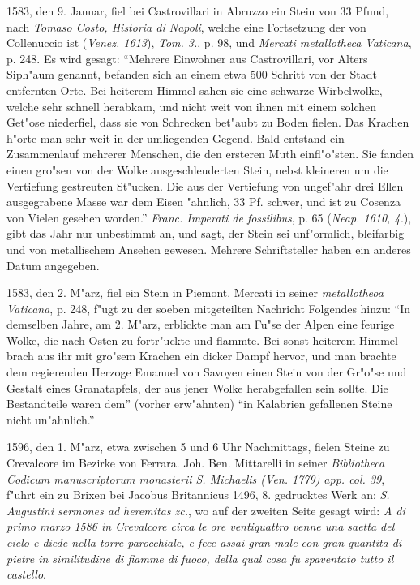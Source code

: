 \documentclass[a4paper, 11pt, oneside, polutonikogreek, german]{article}
\begin{document}
1583, den 9. Januar, fiel bei Castrovillari in Abruzzo ein Stein von 33 Pfund, nach \emph{Tomaso Costo, Historia di Napoli}, welche eine Fortsetzung der von Collenuccio ist (\emph{Venez. 1613}), \emph{Tom. 3.}, p. 98, und \emph{Mercati metallotheca Vaticana}, p. 248. Es wird gesagt: "`Mehrere Einwohner aus Castrovillari, vor Alters Siph"aum genannt, befanden sich an einem etwa 500 Schritt von der Stadt entfernten Orte. Bei heiterem Himmel sahen sie eine schwarze Wirbelwolke, welche sehr schnell herabkam, und nicht weit von ihnen mit einem solchen Get"ose niederfiel, dass sie von Schrecken bet"aubt zu Boden fielen. Das Krachen h"orte man sehr weit in der umliegenden Gegend. Bald entstand ein Zusammenlauf mehrerer Menschen, die den ersteren Muth einfl"o"sten. Sie fanden einen gro"sen von der Wolke ausgeschleuderten Stein, nebst kleineren um die Vertiefung gestreuten St"ucken. Die aus der Vertiefung von ungef"ahr drei Ellen ausgegrabene Masse war dem Eisen "ahnlich, 33 Pf. schwer, und ist zu Cosenza von Vielen gesehen worden."' \emph{Franc. Imperati de fossilibus}, p. 65 (\emph{Neap. 1610, 4.}), gibt das Jahr nur unbestimmt an, und sagt, der Stein sei unf"ormlich, bleifarbig und von metallischem Ansehen gewesen. Mehrere Schriftsteller haben ein anderes Datum angegeben.

1583, den 2. M"arz, fiel ein Stein in Piemont. Mercati in seiner \emph{metallotheoa Vaticana}, p. 248, f"ugt zu der soeben mitgeteilten Nachricht Folgendes hinzu: "`In demselben Jahre, am 2. M"arz, erblickte man am Fu"se der Alpen eine feurige Wolke, die nach Osten zu fortr"uckte und flammte. Bei sonst heiterem Himmel brach aus ihr mit gro"sem Krachen ein dicker Dampf hervor, und man brachte dem regierenden Herzoge Emanuel von Savoyen einen Stein von der Gr"o"se und Gestalt eines Granatapfels, der aus jener Wolke herabgefallen sein sollte. Die Bestandteile waren dem"' (vorher erw"ahnten) "`in Kalabrien gefallenen Steine nicht un"ahnlich."'

1596, den 1. M"arz, etwa zwischen 5 und 6 Uhr Nachmittags, fielen Steine zu Crevalcore im Bezirke von Ferrara. Joh. Ben. Mittarelli in seiner \emph{Bibliotheca Codicum manuscriptorum monasterii S. Michaelis (Ven. 1779) app. col. 39}, f"uhrt ein zu Brixen bei Jacobus Britannicus 1496, 8. gedrucktes Werk an: \emph{S. Augustini sermones ad heremitas zc.}, wo auf der zweiten Seite gesagt wird: \emph{A di primo marzo 1586 in Crevalcore circa le ore ventiquattro venne una saetta del cielo e diede nella torre parocchiale, e fece assai gran male con gran quantita di pietre in similitudine di fiamme di fuoco, della qual cosa fu spaventato tutto il castello}.
\end{document}
